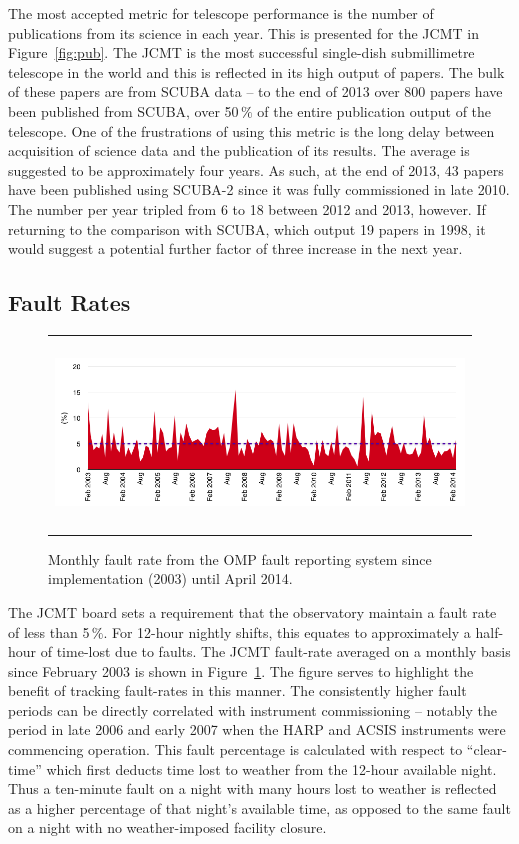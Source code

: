 \documentclass[]{spie}  %
\begin{document}
The most accepted metric for telescope performance is the number of
publications from its science in each year. This is presented for the
JCMT in Figure~\ref{fig:pub}. The JCMT is the most successful
single-dish submillimetre telescope in the world and this is reflected
in its high output of papers. The bulk of these papers are from SCUBA
data -- to the end of 2013 over 800 papers have been published from
SCUBA, over 50\,$\%$ of the entire publication output of the
telescope. One of the frustrations of using this metric is the long
delay between acquisition of science data and the publication of its
results. The average is suggested to be approximately four years. As
such, at the end of 2013, 43 papers have been published using SCUBA-2
since it was fully commissioned in late 2010. The number per year
tripled from 6 to 18 between 2012 and 2013, however. If returning to
the comparison with SCUBA, which output 19 papers in 1998, it would
suggest a potential further factor of three increase in the next year.


\subsection{Fault Rates}\label{sec:rates}
\begin{figure}[ht]
   \begin{center}
   \begin{tabular}{c}
   \includegraphics[height=5cm]{Faultrate2003_2014}
   \end{tabular}
   \end{center}
   \caption{\label{fig:fault}Monthly fault rate from the OMP fault reporting system since implementation (2003) until April 2014.}
\end{figure}

The JCMT board sets a requirement that the observatory maintain a
fault rate of less than 5\,$\%$. For 12-hour nightly shifts, this
equates to approximately a half-hour of time-lost due to faults. The
JCMT fault-rate averaged on a monthly basis since February 2003 is
shown in Figure~\ref{fig:fault}. The figure serves to highlight the
benefit of tracking fault-rates in this manner. The consistently
higher fault periods can be directly correlated with instrument
commissioning -- notably the period in late 2006 and early 2007 when
the HARP and ACSIS instruments were commencing operation. This fault
percentage is calculated with respect to ``clear-time'' which first
deducts time lost to weather from the 12-hour available night. Thus a
ten-minute fault on a night with many hours lost to weather is
reflected as a higher percentage of that night's available time, as
opposed to the same fault on a night with no weather-imposed facility
closure.
\end{document}
